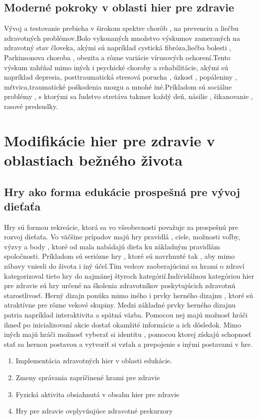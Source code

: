 \documentclass[10pt,oneside,slovak,a4paper]{article}
\begin{document}
\subsection{Moderné pokroky v oblasti hier pre zdravie}
Vývoj a testovanie prebieha v širokom spektre chorôb , na prevenciu a liečbu zdravotných problémov.Bolo vykonaných množstvo výskumov zameraných na zdravotný stav človeka, akými sú napríklad cystická fibróza,liečba bolesti , Parkinsonova choroba , obezita a rôzne variácie vírusových ochorení.Tento výskum zahŕňal mimo iných i psychické  choroby a rehabilitácie, akými sú napríklad depresia, posttraumatická stresová porucha , úzkosť , popáleniny , mŕtvica,traumatické poškodenia mozgu a mnohé iné.Príkladom sú sociálne problémy , s ktorými sa ľudstvo stretáva takmer každý deň, násilie , šikanovanie , rasové predsudky\cite{bworld}.
\label{nejaka}
\section{Modifikácie hier pre zdravie v oblastiach bežného života}

\subsection{Hry ako forma edukácie prospešná pre vývoj dieťaťa}
Hry sú formou rekreácie, ktorá sa vo všeobecnosti považuje za prospešnú pre rozvoj dieťaťa. Vo väčšine prípadov majú hry pravidlá , ciele, možnosti voľby, výzvy a body , ktoré od mala nabádajú dieťa ku základným pravidlám spoločnosti. Príkladom sú seriózne hry , ktoré sú navrhnuté tak , aby mimo zábavy vniesli do života i iný účel.Tím vedcov zaoberajúcimi sa hrami o zdraví kategorizoval tieto hry do najmänej štyroch kategórií.Individálnou kategóriou hier pre zdravie sú hry určené na školenia zdravotníkov poskytujúcich zdravotnú starostlivosť. Herný dizajn ponúka mimo iného i prvky herného dizajnu , ktoré sú atraktívne pre rôzne vekové skupiny. Medzi základné prvky herného dizajnu patria napríklad interaktivita a spätná väzba. Pomocou nej majú možnosť hráči ihneď po inicializovaní akcie dostať okamžité informácie a ich dôsledok. Mimo iných majú hráči možnosť vyberať si identitu , pomocou ktorej získajú schopnosť stať sa hernou postavou a vytvoriť si vzťah a prepojenie s inými postavami v hre.
\begin{enumerate}
    \item{Implementácia zdravotných hier v oblasti edukácie.}
    \item{Zmeny správania zapríčinené hrami pre zdravie}
    \item{Fyzická aktivita obsiahnutá v obsahu hier pre zdravie}
    \item{Hry pre zdravie ovplyvňujúce zdravotné prekurzory}
\end{enumerate}
\end{document}
